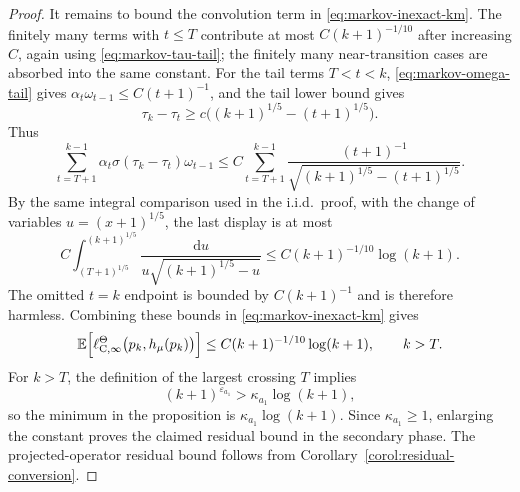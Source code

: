 \documentclass{article}
\newcommand{\E}{\mathbb{E}}
\begin{document}
\begin{proof}
It remains to bound the convolution term in \eqref{eq:markov-inexact-km}. The finitely many terms with $t\le T$ contribute at most $C(k+1)^{-1/10}$ after increasing $C$, again using \eqref{eq:markov-tau-tail}; the finitely many near-transition cases are absorbed into the same constant. For the tail terms $T<t<k$, \eqref{eq:markov-omega-tail} gives $\alpha_t\omega_{t-1}\le C(t+1)^{-1}$, and the tail lower bound gives
\begin{equation}
\tau_k-\tau_t\ge c\bigl((k+1)^{1/5}-(t+1)^{1/5}\bigr).
\end{equation}
Thus
\begin{equation}
\sum_{t=T+1}^{k-1}\alpha_t\sigma(\tau_k-\tau_t)\omega_{t-1} \le C\sum_{t=T+1}^{k-1} \frac{(t+1)^{-1}}{\sqrt{(k+1)^{1/5}-(t+1)^{1/5}}}.
\end{equation}
By the same integral comparison used in the i.i.d.\ proof, with the change of variables $u=(x+1)^{1/5}$, the last display is at most
\begin{equation}
C\int_{(T+1)^{1/5}}^{(k+1)^{1/5}} \frac{\mathrm d u}{u\sqrt{(k+1)^{1/5}-u}} \le C(k+1)^{-1/10}\log(k+1).
\end{equation}
The omitted $t=k$ endpoint is bounded by $C(k+1)^{-1}$ and is therefore harmless. Combining these bounds in \eqref{eq:markov-inexact-km} gives
\begin{equation}
\E\Bigl[\ell^\Theta_{\mathrm C,\infty}\bigl(p_k,h_\mu(p_k)\bigr)\Bigr] \le C(k+1)^{-1/10}\log(k+1),\qquad k>T.
\end{equation}
For $k>T$, the definition of the largest crossing $T$ implies
\begin{equation}
(k+1)^{\varepsilon_{a_1}}> \kappa_{a_1}\log(k+1),
\end{equation}
so the minimum in the proposition is $\kappa_{a_1}\log(k+1)$. Since $\kappa_{a_1}\ge1$, enlarging the constant proves the claimed residual bound in the secondary phase. The projected-operator residual bound follows from Corollary~\ref{corol:residual-conversion}.
\end{proof}
\end{document}
